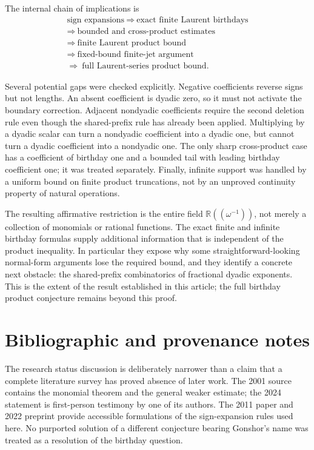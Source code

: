 \documentclass[11pt,letterpaper]{article}
\numberwithin{equation}{section}
\theoremstyle{definition}
\theoremstyle{remark}
\newcommand{\R}{\mathbb{R}}
\begin{document}
The internal chain of implications is
\[
\begin{gathered}
 \text{sign expansions}\ \Longrightarrow\
 \text{exact finite Laurent birthdays}\\
 \Longrightarrow\ \text{bounded and cross-product estimates}\\
 \Longrightarrow\ \text{finite Laurent product bound}\\
 \Longrightarrow\ \text{fixed-bound finite-jet argument}\\
 \Longrightarrow\ \text{full Laurent-series product bound}.
\end{gathered}
\]

Several potential gaps were checked explicitly. Negative coefficients reverse
signs but not lengths. An absent coefficient is dyadic zero, so it must not
activate the boundary correction. Adjacent nondyadic coefficients require the
second deletion rule even though the shared-prefix rule has already been
applied. Multiplying by a dyadic scalar can turn a nondyadic coefficient into
a dyadic one, but cannot turn a dyadic coefficient into a nondyadic one.
The only sharp cross-product case has a coefficient of birthday one and a
bounded tail with leading birthday coefficient one; it was treated separately.
Finally, infinite support was handled by a uniform bound on finite product
truncations, not by an unproved continuity property of natural operations.

The resulting affirmative restriction is the entire field
$\R((\omega^{-1}))$, not merely a collection of monomials or rational functions.
The exact finite and infinite birthday formulas supply additional information
that is independent of the product inequality. In particular they expose why
some straightforward-looking normal-form arguments lose the required bound,
and they identify a concrete next obstacle: the shared-prefix combinatorics of
fractional dyadic exponents. This is the extent of the result established in
this article; the full birthday product conjecture remains beyond this proof.

\appendix
\section{Bibliographic and provenance notes}
The research status discussion is deliberately narrower than a claim that a
complete literature survey has proved absence of later work. The 2001 source
contains the monomial theorem and the general weaker estimate; the 2024
statement is first-person testimony by one of its authors. The 2011 paper and
2022 preprint provide accessible formulations of the sign-expansion rules used
here. No purported solution of a different conjecture bearing Gonshor's name
was treated as a resolution of the birthday question.
\end{document}
